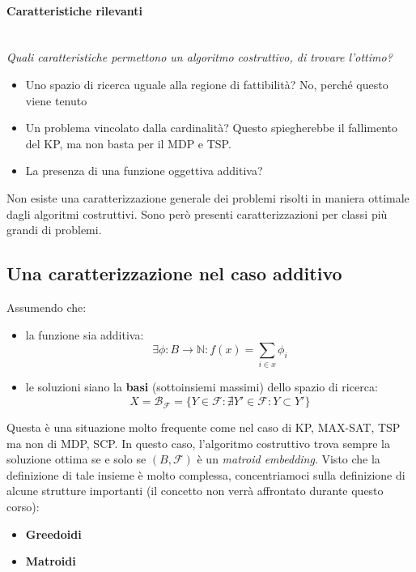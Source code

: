 \documentclass{article}
\begin{document}
    \paragraph{Caratteristiche rilevanti}\mbox{}\\
    \textit{Quali caratteristiche permettono un algoritmo costruttivo, di trovare l'ottimo?}
    \begin{itemize}
        \item Uno spazio di ricerca uguale alla regione di fattibilità? No, perché questo viene tenuto
        \item Un problema vincolato dalla cardinalità? Questo spiegherebbe il fallimento del KP,
              ma non basta per il MDP e TSP.
        \item La presenza di una funzione oggettiva additiva?
    \end{itemize}
    Non esiste una caratterizzazione generale dei problemi risolti in maniera ottimale dagli algoritmi
    costruttivi. Sono però presenti caratterizzazioni per classi più grandi di problemi.

    \subsection{Una caratterizzazione nel caso additivo}
    Assumendo che:
    \begin{itemize}
        \item la funzione sia additiva:
              $$\exists\phi : B\rightarrow\mathbb{N}:f(x)=\sum_{i\in x}\phi_i$$
        \item le soluzioni siano la \textbf{basi} (sottoinsiemi massimi) dello spazio di ricerca:
              $$X=\mathcal{B}_\mathcal{F}=\{Y\in\mathcal{F}:\nexists Y'\in\mathcal{F}:Y\subset Y'\}$$
    \end{itemize}
    Questa è una situazione molto frequente come nel caso di KP, MAX-SAT, TSP ma non di MDP, SCP.
    In questo caso, l'algoritmo costruttivo trova sempre la soluzione ottima se e solo se $(B,\mathcal{F})$
    è un \textit{matroid embedding}. Visto che la definizione di tale insieme è molto complessa,
    concentriamoci sulla definizione di alcune strutture importanti (il concetto non verrà
    affrontato durante questo corso):
    \begin{itemize}
        \item \textbf{Greedoidi}
        \item \textbf{Matroidi}
    \end{itemize}
\end{document}
